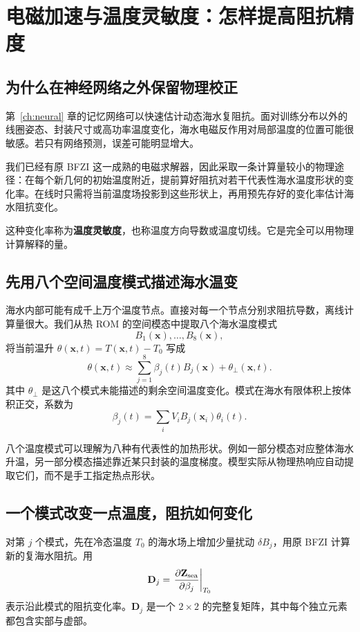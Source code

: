 \chapter{电磁加速与温度灵敏度：怎样提高阻抗精度}
\label{ch:tangent}

\section{为什么在神经网络之外保留物理校正}
第~\ref{ch:neural} 章的记忆网络可以快速估计动态海水复阻抗。面对训练分布以外的线圈姿态、封装尺寸或高功率温度变化，海水电磁反作用对局部温度的位置可能很敏感。若只有网络预测，误差可能明显增大。

我们已经有原 BFZI 这一成熟的电磁求解器，因此采取一条计算量较小的物理途径：在每个新几何的初始温度附近，提前算好阻抗对若干代表性海水温度形状的变化率。在线时只需将当前温度场投影到这些形状上，再用预先存好的变化率估计海水阻抗变化。

这种变化率称为\textbf{温度灵敏度}，也称温度方向导数或温度切线。它是完全可以用物理计算解释的量。

\section{先用八个空间温度模式描述海水温变}
海水内部可能有成千上万个温度节点。直接对每一个节点分别求阻抗导数，离线计算量很大。我们从热 ROM 的空间模态中提取八个海水温度模式
\[
B_1(\mathbf x),\dots,B_8(\mathbf x),
\]
将当前温升 $\theta(\mathbf x,t)=T(\mathbf x,t)-T_0$ 写成
\[
\theta(\mathbf x,t)\approx \sum_{j=1}^8\beta_j(t)B_j(\mathbf x)
+\theta_\perp(\mathbf x,t).
\]
其中 $\theta_\perp$ 是这八个模式未能描述的剩余空间温度变化。模式在海水有限体积上按体积正交，系数为
\begin{equation}
\beta_j(t)=\sum_i V_i B_j(\mathbf x_i)\theta_i(t).
\end{equation}

八个温度模式可以理解为八种有代表性的加热形状。例如一部分模态对应整体海水升温，另一部分模态描述靠近某只封装的温度梯度。模型实际从物理热响应自动提取它们，而不是手工指定热点形状。

\section{一个模式改变一点温度，阻抗如何变化}
对第 $j$ 个模式，先在冷态温度 $T_0$ 的海水场上增加少量扰动 $\delta B_j$，用原 BFZI 计算新的复海水阻抗。用
\begin{equation}
\mathbf D_j=
\left.\frac{\partial\mathbf Z_{\mathrm{sea}}}{\partial\beta_j}\right|_{T_0}
\end{equation}
表示沿此模式的阻抗变化率。$\mathbf D_j$ 是一个 $2\times2$ 的完整复矩阵，其中每个独立元素都包含实部与虚部。

